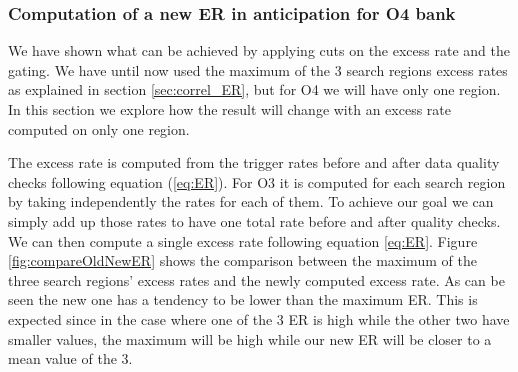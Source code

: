 \clearpage\newpage
\subsubsection{Computation of a new ER in anticipation for O4 bank}
\label{sec:newER}
We have shown what can be achieved by applying cuts on the excess rate and the gating.
We have until now used the maximum of the 3 search regions excess rates as explained in section \ref{sec:correl_ER}, but for O4 we will have only one region.
In this section we explore how the result will change with an excess rate computed on only one region.

The excess rate is computed from the trigger rates before and after data quality checks following equation (\ref{eq:ER}).
For O3 it is computed for each search region by taking independently the rates for each of them.
To achieve our goal we can simply add up those rates  to have one total rate before and after quality checks.
We can then compute a single excess rate following equation \ref{eq:ER}.
Figure \ref{fig:compareOldNewER} shows the comparison between the maximum of the three search regions' excess rates and the newly computed excess rate.
As can be seen the new one has a tendency to be lower than the maximum ER.
This is expected since in the case where one of the 3 ER is high while the other two have smaller values, the maximum will be high while our new ER will be closer to a mean value of the 3.

